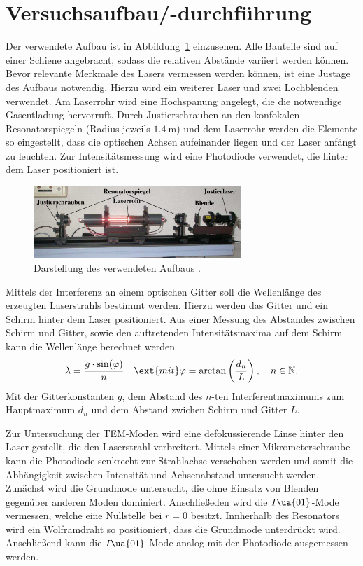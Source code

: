 \section{Versuchsaufbau/-durchführung}
Der verwendete Aufbau ist in Abbildung~\ref{fig: aufbau} einzusehen. Alle Bauteile sind auf einer Schiene angebracht, sodass die
relativen Abstände variiert werden können. Bevor relevante Merkmale des Lasers vermessen werden können, ist eine
Justage des Aufbaus notwendig. Hierzu wird ein weiterer Laser und zwei Lochblenden verwendet. Am Laserrohr wird eine Hochspanung
angelegt, die die notwendige Gasentladung hervorruft. Durch Justierschrauben an den konfokalen Resonatorspiegeln (Radius jeweils $\SI{1.4}{\meter}$)
und dem Laserrohr werden die Elemente so eingestellt, dass die optischen Achsen aufeinander liegen und der Laser anfängt zu leuchten.
Zur Intensitätsmessung wird eine Photodiode verwendet, die hinter dem Laser positioniert ist.
\begin{figure}
  \centering
  \includegraphics[width = 0.7\textwidth]{theorie_bilder/aufbau.png}
  \caption{Darstellung des verwendeten Aufbaus \cite{anleitung61}.}
  \label{fig: aufbau}
\end{figure}

Mittels der Interferenz an einem optischen Gitter soll die Wellenlänge des erzeugten Laserstrahls bestimmt werden. Hierzu werden das Gitter
und ein Schirm hinter dem Laser positioniert. Aus einer Messung des Abstandes zwischen Schirm und Gitter, sowie den auftretenden Intensitätsmaxima
auf dem Schirm kann die Wellenlänge berechnet werden
\begin{equation}
  \lambda = \frac{g \cdot \sin(\varphi)}{n}\quad \ext{mit} \varphi = \arctan\left(\frac{d_n}{L} \right) ,\quad n \in \mathbb{N}.
  \label{eq: interferenz}
\end{equation}
Mit der Gitterkonstanten $g$, dem Abstand des $n$-ten Interferentmaximums zum Hauptmaximum $d_{n}$ und dem Abstand zwichen Schirm und Gitter $L$.

Zur Untersuchung der TEM-Moden wird eine defokussierende Linse hinter den Laser gestellt, die den Laserstrahl verbreitert.
Mittels einer Mikrometerschraube kann die Photodiode
senkrecht zur Strahlachse verschoben werden und somit die Abhängigkeit zwischen Intensität und Achsenabstand untersucht werden. Zunächst
wird die Grundmode untersucht, die ohne Einsatz von Blenden gegenüber anderen Moden dominiert. Anschließeden wird die $I\ua{01}$-Mode
vermessen, welche eine Nullstelle bei $r = 0$ besitzt. Innherhalb des Resonators wird ein Wolframdraht so positioniert, dass die Grundmode
unterdrückt wird. Anschließend kann die $I\ua{01}$-Mode analog mit der Photodiode ausgemessen werden.

